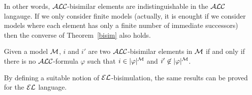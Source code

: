 In other words, $\mathcal{ALC}$-bisimilar elements are indistinguishable in the $\mathcal{ALC}$ langauge.
If we only consider finite models (actually, it is enought if we consider models where each element has only a finite number of immediate successors) then the converse of Theorem~\ref{bisim} also holds.

\begin{theorem}\label{bisim2}
Given a model $\mathcal{M}$, $i$ and $i'$ are two $\mathcal{ALC}$-bisimilar elements in $\mathcal{M}$
if and only if there is no $\mathcal{ALC}$-formula $\varphi$ such that $i \in |\varphi|^{\mathcal{M}}$ and
$i' \not \in |\varphi|^{\mathcal{M}}$.
\end{theorem}

By defining a suitable notion of $\mathcal{EL}$-bisimulation, the same results can be proved for
the $\mathcal{EL}$ language. 

\cite{paig:thre87}

\cite{dovier04:_effic_algor_for_comput_bisim_equiv}

